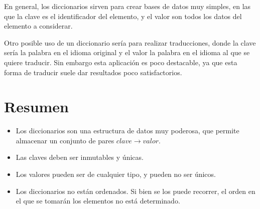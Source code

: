 En general, los diccionarios sirven para crear bases de datos muy simples,
en las que la clave es el identificador del elemento, y el valor son todos
los datos del elemento a considerar.

Otro posible uso de un diccionario sería para realizar
traducciones, donde la clave sería la palabra en el idioma original y el
valor la palabra en el idioma al que se quiere traducir.  Sin embargo esta
aplicación es poco destacable, ya que esta forma de traducir suele dar
resultados poco satisfactorios.

\section{Resumen}

\begin{itemize}
\item Los diccionarios son una estructura de datos
muy poderosa, que permite almacenar un conjunto de pares $clave \rightarrow valor$.
\item Las claves deben ser inmutables y únicas.
\item Los valores pueden ser de cualquier tipo, y pueden no ser únicos.
\item Los diccionarios no están ordenados.  Si bien se los puede recorrer,
el orden en el que se tomarán los elementos no está determinado.
\end{itemize}

